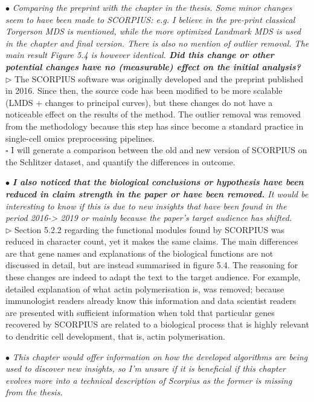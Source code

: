 \documentclass[10pt]{article}
\newcommand{\todo}{$\square$}
\newcommand{\exam}[2][\  ]{\hspace{0pt}\marginpar{\color{myred}#1}$\bullet$ \textit{#2}}
\newcommand{\imp}[1]{\textbf{#1}}
\newcommand{\answ}[1]{{\color{myblue} $\triangleright$ #1}}
\newcommand{\task}[2][\todo]{{\color{myblue} #1 #2}}
\newcommand{\bigexclaim}{\raisebox{-0.1em}{\BigTriangleUp}\hspace{-0.32em}\llap{\small\textbf{!}}\hspace{0.32em}}
\newcommand{\tagimp}{\bigexclaim}
\begin{document}
\exam[\tagimp]{Comparing the preprint with the chapter in the thesis. Some minor changes
	seem to have been made to SCORPIUS: e.g. I believe in the pre-print
	classical Torgerson MDS is mentioned, while the more optimized Landmark
	MDS is used in the chapter and final version. There is also no mention of
	outlier removal. The main result Figure 5.4 is however identical. \imp{Did this
	change or other potential changes have no (measurable) effect on the initial
	analysis?}} \\
\answ{The SCORPIUS software was originally developed and the preprint published in 2016. Since then, the source code has been modified to be more scalable (LMDS + changes to principal curves), but these changes do not have a noticeable effect on the results of the method. The outlier removal was removed from the methodology because this step has since become a standard practice in single-cell omics preprocessing pipelines.} \\
\task{I will generate a comparison between the old and new version of SCORPIUS on the Schlitzer dataset, and quantify the differences in outcome.}

\exam[\tagimp]{\imp{I also noticed that the biological conclusions or hypothesis have
	been reduced in claim strength in the paper or have been removed.} It would
be interesting to know if this is due to new insights that have been found in the
period 2016-> 2019 or mainly because the paper’s target audience has
shifted.} \\
\answ{Section 5.2.2 regarding the functional modules found by SCORPIUS was reduced in character count, yet it makes the same claims. The main differences are that gene names and explanations of the biological functions are not discussed in detail, but are instead summarised in figure 5.4. The reasoning for these changes are indeed to adapt the text to the target audience.
For example, detailed explanation of what actin polymerisation is, was removed; because immunologist readers already know this information and data scientist readers are presented with sufficient information when told that particular genes recovered by SCORPIUS are related to a biological process that is highly relevant to dendritic cell development, that is, actin polymerisation.}

\exam{This chapter would offer information on how the developed algorithms
	are being used to discover new insights, so I’m unsure if it is beneficial if this
	chapter evolves more into a technical description of Scorpius as the former is
	missing from the thesis.}
\end{document}
